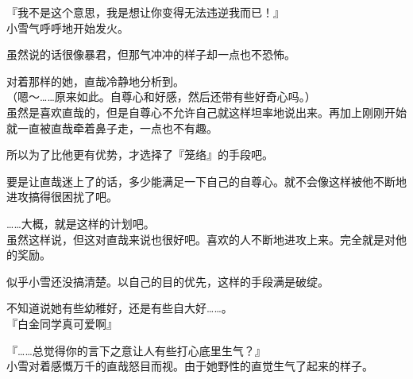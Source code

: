 『我不是这个意思，我是想让你变得无法违逆我而已！』\\

小雪气呼呼地开始发火。

虽然说的话很像暴君，但那气冲冲的样子却一点也不恐怖。

对着那样的她，直哉冷静地分析到。\\

（嗯～……原来如此。自尊心和好感，然后还带有些好奇心吗。）\\

虽然是喜欢直哉的，但是自尊心不允许自己就这样坦率地说出来。再加上刚刚开始就一直被直哉牵着鼻子走，一点也不有趣。

所以为了比他更有优势，才选择了『笼络』的手段吧。

要是让直哉迷上了的话，多少能满足一下自己的自尊心。就不会像这样被他不断地进攻搞得很困扰了吧。

……大概，就是这样的计划吧。\\

虽然这样说，但这对直哉来说也很好吧。喜欢的人不断地进攻上来。完全就是对他的奖励。

似乎小雪还没搞清楚。以自己的目的优先，这样的手段满是破绽。

不知道说她有些幼稚好，还是有些自大好……。\\

『白金同学真可爱啊』

『……总觉得你的言下之意让人有些打心底里生气？』\\

小雪对着感慨万千的直哉怒目而视。由于她野性的直觉生气了起来的样子。
